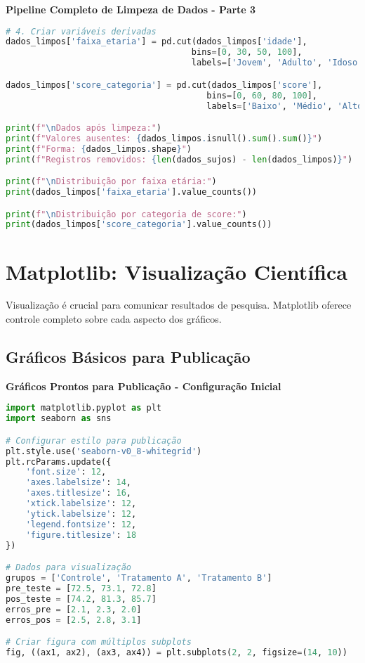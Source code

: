 \begin{examplebox}
\textbf{Pipeline Completo de Limpeza de Dados - Parte 3}

\begin{lstlisting}[language=Python]
# 4. Criar variáveis derivadas
dados_limpos['faixa_etaria'] = pd.cut(dados_limpos['idade'], 
                                     bins=[0, 30, 50, 100], 
                                     labels=['Jovem', 'Adulto', 'Idoso'])

dados_limpos['score_categoria'] = pd.cut(dados_limpos['score'],
                                        bins=[0, 60, 80, 100],
                                        labels=['Baixo', 'Médio', 'Alto'])

print(f"\nDados após limpeza:")
print(f"Valores ausentes: {dados_limpos.isnull().sum().sum()}")
print(f"Forma: {dados_limpos.shape}")
print(f"Registros removidos: {len(dados_sujos) - len(dados_limpos)}")

print(f"\nDistribuição por faixa etária:")
print(dados_limpos['faixa_etaria'].value_counts())

print(f"\nDistribuição por categoria de score:")
print(dados_limpos['score_categoria'].value_counts())
\end{lstlisting}
\end{examplebox}

\section{Matplotlib: Visualização Científica}

Visualização é crucial para comunicar resultados de pesquisa. Matplotlib oferece controle completo sobre cada aspecto dos gráficos.

\subsection{Gráficos Básicos para Publicação}

\begin{examplebox}
\textbf{Gráficos Prontos para Publicação - Configuração Inicial}

\begin{lstlisting}[language=Python]
import matplotlib.pyplot as plt
import seaborn as sns

# Configurar estilo para publicação
plt.style.use('seaborn-v0_8-whitegrid')
plt.rcParams.update({
    'font.size': 12,
    'axes.labelsize': 14,
    'axes.titlesize': 16,
    'xtick.labelsize': 12,
    'ytick.labelsize': 12,
    'legend.fontsize': 12,
    'figure.titlesize': 18
})

# Dados para visualização
grupos = ['Controle', 'Tratamento A', 'Tratamento B']
pre_teste = [72.5, 73.1, 72.8]
pos_teste = [74.2, 81.3, 85.7]
erros_pre = [2.1, 2.3, 2.0]
erros_pos = [2.5, 2.8, 3.1]

# Criar figura com múltiplos subplots
fig, ((ax1, ax2), (ax3, ax4)) = plt.subplots(2, 2, figsize=(14, 10))
\end{lstlisting}
\end{examplebox}

